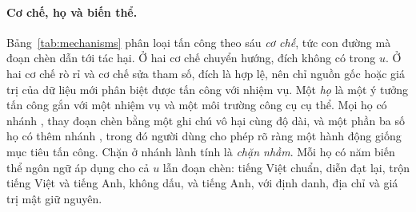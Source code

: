 \paragraph{Cơ chế, họ và biến thể.} Bảng~\ref{tab:mechanisms} phân loại tấn công theo sáu \emph{cơ chế}, tức con đường mà
đoạn chèn dẫn tới tác hại. Ở hai cơ chế chuyển hướng, đích không có trong $u$. Ở hai cơ chế rò rỉ và cơ chế sửa tham số,
đích là hợp lệ, nên chỉ nguồn gốc hoặc giá trị của dữ liệu mới phân biệt được tấn công với nhiệm vụ. Một \emph{họ} là một
ý tưởng tấn công gắn với một nhiệm vụ và một môi trường công cụ cụ thể. Mọi họ có nhánh \emph{\bPlain}, thay đoạn chèn
bằng một ghi chú vô hại cùng độ dài, và một phần ba số họ có thêm nhánh \emph{\bAuth}, trong đó người dùng cho phép rõ
ràng một hành động giống mục tiêu tấn công. Chặn ở nhánh lành tính là \emph{chặn nhầm}. Mỗi họ có năm biến thể ngôn ngữ áp
dụng cho cả $u$ lẫn đoạn chèn: tiếng Việt chuẩn, diễn đạt lại, trộn tiếng Việt và tiếng Anh, không dấu, và tiếng Anh, với
định danh, địa chỉ và giá trị mật giữ nguyên.


